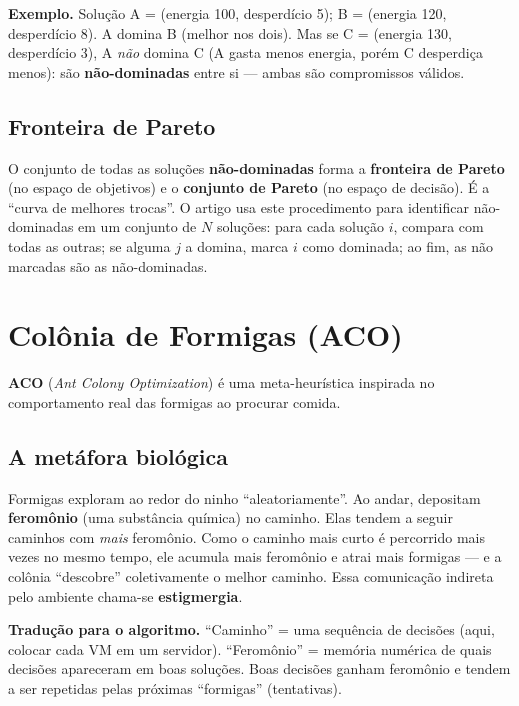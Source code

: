 \documentclass[11pt]{article}
\newcommand{\var}[1]{\textcolor{azul}{$#1$}}
\begin{document}
\begin{ideia}
\textbf{Exemplo.} Solução A = (energia 100, desperdício 5); B = (energia 120,
desperdício 8). A domina B (melhor nos dois). Mas se C = (energia 130,
desperdício 3), A \emph{não} domina C (A gasta menos energia, porém C desperdiça
menos): são \textbf{não-dominadas} entre si — ambas são compromissos válidos.
\end{ideia}

\subsection{Fronteira de Pareto}
O conjunto de todas as soluções \textbf{não-dominadas} forma a \textbf{fronteira
de Pareto} (no espaço de objetivos) e o \textbf{conjunto de Pareto} (no espaço de
decisão). É a ``curva de melhores trocas''. O artigo usa este procedimento para
identificar não-dominadas em um conjunto de \var{N} soluções: para cada solução
\var{i}, compara com todas as outras; se alguma \var{j} a domina, marca \var{i}
como dominada; ao fim, as não marcadas são as não-dominadas.

\section{Colônia de Formigas (ACO)}
\textbf{ACO} (\emph{Ant Colony Optimization}) é uma meta-heurística inspirada no
comportamento real das formigas ao procurar comida.

\subsection{A metáfora biológica}
Formigas exploram ao redor do ninho ``aleatoriamente''. Ao andar, depositam
\textbf{feromônio} (uma substância química) no caminho. Elas tendem a seguir
caminhos com \emph{mais} feromônio. Como o caminho mais curto é percorrido mais
vezes no mesmo tempo, ele acumula mais feromônio e atrai mais formigas — e a
colônia ``descobre'' coletivamente o melhor caminho. Essa comunicação indireta
pelo ambiente chama-se \textbf{estigmergia}.

\begin{ideia}
\textbf{Tradução para o algoritmo.} ``Caminho'' = uma sequência de decisões
(aqui, colocar cada VM em um servidor). ``Feromônio'' = memória numérica de quais
decisões apareceram em boas soluções. Boas decisões ganham feromônio e tendem a
ser repetidas pelas próximas ``formigas'' (tentativas).
\end{ideia}
\end{document}

